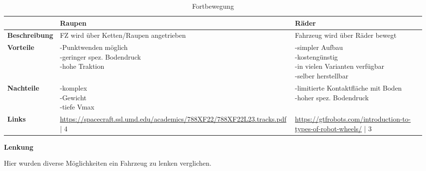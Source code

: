 \begin{table}[H]
\centering
\small
\begin{tabularx}{\textwidth}{|l|X|X|}
\hline
\textbf{} & \textbf{Raupen} & \textbf{Räder} \\
  \hline
  \textbf{Beschreibung}  & FZ wird über Ketten/Raupen angetrieben & Fahrzeug wird über Räder bewegt \\
  \hline
  \textbf{Vorteile}  & \makecell{-Punktwenden möglich\\-geringer spez. Bodendruck\\-hohe Traktion} & \makecell{-simpler Aufbau\\-kostengünstig\\-in vielen Varianten verfügbar\\-selber herstellbar}  \\
  \hline
  \textbf{Nachteile} & \makecell{-komplex\\-Gewicht\\-tiefe Vmax} & \makecell{-limitierte Kontaktfläche mit Boden\\-hoher spez. Bodendruck} \\
  \hline
  \textbf{Links} & \url{https://spacecraft.ssl.umd.edu/academics/788XF22/788XF22L23.tracks.pdf} | 4 & \url{https://gtfrobots.com/introduction-to-types-of-robot-wheels/} | 3\\
  \hline
\end{tabularx}
\caption{Fortbewegung}
\label{table:drive}
\end{table}



\textbf{Lenkung}

Hier wurden diverse Möglichkeiten ein Fahrzeug zu lenken verglichen. 

